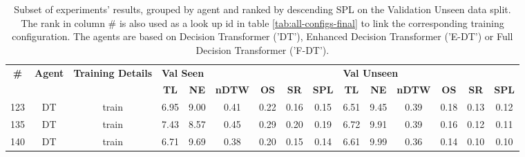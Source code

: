 \begin{table}
\centering
\caption{\label{tab:normalized_visual_features}Subset of experiments' results, grouped by agent and ranked by descending SPL on the Validation Unseen data split. The rank in column \# is also used as a look up id in table \ref{tab:all-configs-final} to link the corresponding training configuration.     \newline The agents are based on Decision Transformer ('DT'), Enhanced Decision Transformer ('E-DT') or Full Decision Transformer ('F-DT').}
\begin{tabular}{@{\hskip3pt}c@{\hskip3pt}c@{\hskip3pt}c@{\hskip3pt}c@{\hskip3pt}c@{\hskip3pt}c@{\hskip3pt}c@{\hskip3pt}c@{\hskip3pt}c@{\hskip3pt}c@{\hskip3pt}c@{\hskip3pt}c@{\hskip3pt}c@{\hskip3pt}c@{\hskip3pt}c}
\toprule
\textbf{\#} & \textbf{Agent} & \textbf{Training Details} & \multicolumn{6}{l}{\textbf{Val Seen}} & \multicolumn{6}{l}{\textbf{Val Unseen}} \\
 \textbf{~} &     \textbf{~} &                \textbf{~} &       \textbf{TL} & \textbf{NE} & \textbf{nDTW} & \textbf{OS} & \textbf{SR} & \textbf{SPL} &         \textbf{TL} & \textbf{NE} & \textbf{nDTW} & \textbf{OS} & \textbf{SR} & \textbf{SPL} \\
\midrule
        123 &             DT &                     train &              6.95 &        9.00 &          0.41 &        0.22 &        0.16 &         0.15 &                6.51 &        9.45 &          0.39 &        0.18 &        0.13 &         0.12 \\
        135 &             DT &                     train &              7.43 &        8.57 &          0.45 &        0.29 &        0.20 &         0.19 &                6.72 &        9.91 &          0.39 &        0.16 &        0.12 &         0.11 \\
        140 &             DT &                     train &              6.71 &        9.69 &          0.38 &        0.20 &        0.15 &         0.14 &                6.61 &        9.99 &          0.36 &        0.14 &        0.10 &         0.10 \\
\bottomrule
\end{tabular}
\end{table}
